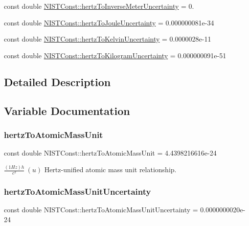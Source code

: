 \begin{DoxyCompactItemize}
\item 
const double \hyperlink{group___n_i_s_t_const-_hertz_ga4a12fd74059017b7f715ed732182c47b}{N\+I\+S\+T\+Const\+::hertz\+To\+Inverse\+Meter\+Uncertainty} = 0.
\item 
const double \hyperlink{group___n_i_s_t_const-_hertz_ga6fde96f31fcfe10060d6996d0d5ff117}{N\+I\+S\+T\+Const\+::hertz\+To\+Joule\+Uncertainty} = 0.\+000000081e-\/34
\item 
const double \hyperlink{group___n_i_s_t_const-_hertz_gacdec68d8c592492309f427551ae82a21}{N\+I\+S\+T\+Const\+::hertz\+To\+Kelvin\+Uncertainty} = 0.\+0000028e-\/11
\item 
const double \hyperlink{group___n_i_s_t_const-_hertz_gab0659e6441271775cddea1c3bef17708}{N\+I\+S\+T\+Const\+::hertz\+To\+Kilogram\+Uncertainty} = 0.\+000000091e-\/51
\end{DoxyCompactItemize}


\subsection{Detailed Description}


\subsection{Variable Documentation}
\mbox{\label{group___n_i_s_t_const-_hertz_ga5e2fd7ea13ae13a34435ff0578082d34}} 
\subsubsection{\texorpdfstring{hertz\+To\+Atomic\+Mass\+Unit}{hertzToAtomicMassUnit}}
{\footnotesize\ttfamily const double N\+I\+S\+T\+Const\+::hertz\+To\+Atomic\+Mass\+Unit = 4.\+4398216616e-\/24}

$\frac{(1 Hz)h}{c^2} \ (u)$ Hertz-\/unified atomic mass unit relationship. \mbox{\label{group___n_i_s_t_const-_hertz_ga7ec0e57b96db2ded3c361465c8770d71}} 
\subsubsection{\texorpdfstring{hertz\+To\+Atomic\+Mass\+Unit\+Uncertainty}{hertzToAtomicMassUnitUncertainty}}
{\footnotesize\ttfamily const double N\+I\+S\+T\+Const\+::hertz\+To\+Atomic\+Mass\+Unit\+Uncertainty = 0.\+0000000020e-\/24}

